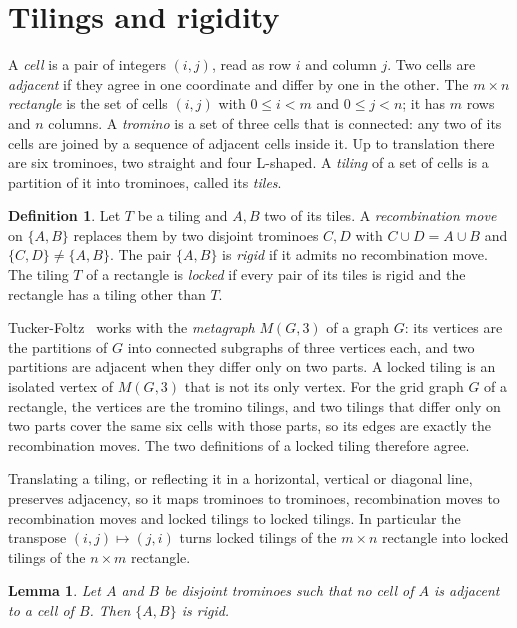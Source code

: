 \documentclass[11pt]{article}
\newtheorem{lemma}[theorem]{Lemma}
\theoremstyle{definition}
\newtheorem{definition}[theorem]{Definition}
\theoremstyle{remark}
\begin{document}
\section{Tilings and rigidity}\label{sec:defs}

A \emph{cell} is a pair of integers $(i,j)$, read as row $i$ and column $j$.
Two cells are \emph{adjacent} if they agree in one coordinate and differ by
one in the other. The $m\times n$ \emph{rectangle} is the set of cells
$(i,j)$ with $0\le i<m$ and $0\le j<n$; it has $m$ rows and $n$ columns. A
\emph{tromino} is a set of three cells that is connected: any two of its
cells are joined by a sequence of adjacent cells inside it. Up to
translation there are six trominoes, two straight and four L-shaped. A
\emph{tiling} of a set of cells is a partition of it into trominoes, called
its \emph{tiles}.

\begin{definition}\label{def:locked}
Let $T$ be a tiling and $A,B$ two of its tiles. A \emph{recombination move}
on $\{A,B\}$ replaces them by two disjoint trominoes $C,D$ with
$C\cup D=A\cup B$ and $\{C,D\}\ne\{A,B\}$. The pair $\{A,B\}$ is
\emph{rigid} if it admits no recombination move. The tiling $T$ of a
rectangle is \emph{locked} if every pair of its tiles is rigid and the
rectangle has a tiling other than $T$.
\end{definition}

Tucker-Foltz~\cite[Section~1]{tf} works with the \emph{metagraph}
$M(G,3)$ of a graph $G$: its vertices are the partitions of $G$ into
connected subgraphs of three vertices each, and two partitions are adjacent
when they differ only on two parts. A locked tiling is an isolated vertex of
$M(G,3)$ that is not its only vertex. For the grid graph $G$ of a rectangle,
the vertices are the tromino tilings, and two tilings that differ only on two
parts cover the same six cells with those parts, so its edges are exactly the
recombination moves. The two definitions of a locked tiling therefore agree.

Translating a tiling, or reflecting it in a horizontal, vertical or diagonal
line, preserves adjacency, so it maps trominoes to trominoes, recombination
moves to recombination moves and locked tilings to locked tilings. In
particular the transpose $(i,j)\mapsto(j,i)$ turns locked tilings of the
$m\times n$ rectangle into locked tilings of the $n\times m$ rectangle.

\begin{lemma}\label{lem:apart}
Let $A$ and $B$ be disjoint trominoes such that no cell of $A$ is adjacent
to a cell of $B$. Then $\{A,B\}$ is rigid.
\end{lemma}
\end{document}
